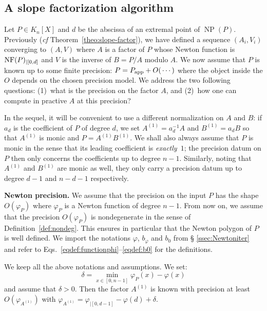 \documentclass{sig-alternate-2013}
\DeclareMathOperator{\NP}{NP}
\newcommand{\NF}{\text{\rm NF}}
\newcommand{\app}{\textrm{app}}
\begin{document}
\subsection{A slope factorization algorithm}

Let $P \in K_n[X]$ and $d$ be the abscissa of an extremal point of 
$\NP(P)$. Previously (\emph{cf} Theorem~\ref{theo:slope-factor}), we 
have defined a sequence $(A_i, V_i)$ converging to $(A,V)$ where $A$ is 
a factor of $P$ whose Newton function is $\NF(P)_{|[0,d]}$ and $V$ is the inverse of $B = P/A$ modulo $A$.
We now assume that $P$ is known up to some finite precision: $P = P_\app + 
O(\hspace{0.5mm}\cdots)$ where the object inside the $O$ depends on the 
chosen precision model. We address the two following questions:
(1)~what is the precision on the factor $A$, and
(2)~how one can compute in practive $A$ at this precision?

In the sequel, it will be convenient to use a different normalization on 
$A$ and $B$: if $a_d$ is the coefficient of $P$ of degree $d$, we set
$A^{(1)} = a_d^{-1} A$ and $B^{(1)} = a_d B$
so that $A^{(1)}$ is monic and $P = A^{(1)} B^{(1)}$. We shall also 
always assume that $P$ is monic in the sense that its leading
coefficient is \emph{exactly}~$1$; the precision datum on $P$ then 
only concerns the coefficients up to degree $n{-}1$. Similarly, noting
that $A^{(1)}$ and $B^{(1)}$ are monic as well, they only carry a
precision datum up to degree $d{-}1$ and $n{-}d{-}1$ respectively.

\medskip

\noindent
{\bf Newton precision.}
We assume that the precision on the input $P$ has the shape 
$O(\varphi_P)$ where $\varphi_P$ is a Newton function of degree 
$n{-}1$. From now on, we assume that the precision $O(\varphi_P)$ 
is nondegenerate in the sense of Definition~\ref{def:nondeg}. This
ensures in particular that the Newton polygon of $P$ is well defined. 
We import the notations $\varphi$, $b_\varphi$ and $b_0$ from \S 
\ref{ssec:Newtoniter} and refer to 
Eqs.~\eqref{eqdef:functionphi}--\eqref{eqdef:b0} for the definitions.

\begin{prop}
We keep all the above notations and assumptions. We set:
$$\delta = \min_{x \in [0,n{-}1]} \varphi_P(x) - \varphi(x)$$
and assume that $\delta > 0$. 
Then the factor $A^{(1)}$ is known with precision at least 
$O(\varphi_{A^{(1)}})$ with
$\varphi_{A^{(1)}} = \varphi_{|[0,d{-}1]} - \varphi(d) + \delta$.
\end{prop}
\end{document}
